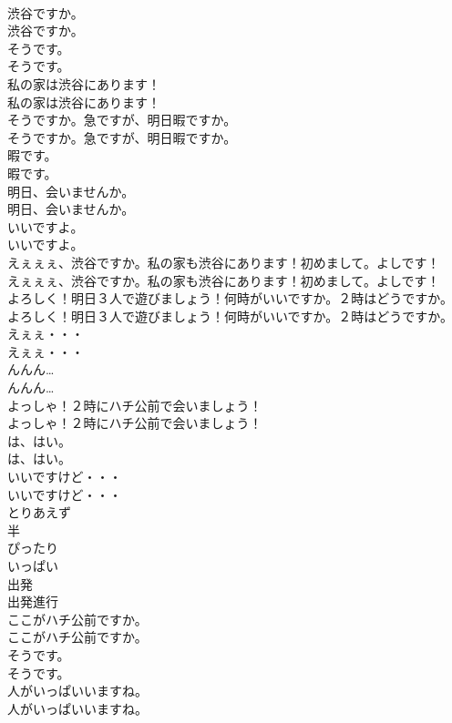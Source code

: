 \documentclass[8pt]{extreport}
\begin{document}
\begin{CJK}{UTF8}{min}
\\	渋谷ですか。	
\\	渋谷ですか。 
\\	そうです。	
\\	そうです。 
\\	私の家は渋谷にあります！	
\\	私の家は渋谷にあります！ 
\\	そうですか。急ですが、明日暇ですか。	
\\	そうですか。急ですが、明日暇ですか。 
\\	暇です。	
\\	暇です。 
\\	明日、会いませんか。	
\\	明日、会いませんか。 
\\	いいですよ。	
\\	いいですよ。 
\\	えぇぇぇ、渋谷ですか。私の家も渋谷にあります！初めまして。よしです！	
\\	えぇぇぇ、渋谷ですか。私の家も渋谷にあります！初めまして。よしです！ 
\\	よろしく！明日３人で遊びましょう！何時がいいですか。２時はどうですか。	
\\	よろしく！明日３人で遊びましょう！何時がいいですか。２時はどうですか。 
\\	えぇぇ・・・	
\\	えぇぇ・・・ 
\\	んんん…	
\\	んんん… 
\\	よっしゃ！２時にハチ公前で会いましょう！	
\\	よっしゃ！２時にハチ公前で会いましょう！ 
\\	は、はい。	
\\	は、はい。 
\\	いいですけど・・・	
\\	いいですけど・・・ 
\\	とりあえず
\\	半
\\	ぴったり
\\	いっぱい
\\	出発
\\	出発進行
\\	ここがハチ公前ですか。	
\\	ここがハチ公前ですか。 
\\	そうです。	
\\	そうです。 
\\	人がいっぱいいますね。	
\\	人がいっぱいいますね。 

\end{CJK}
\end{document}
